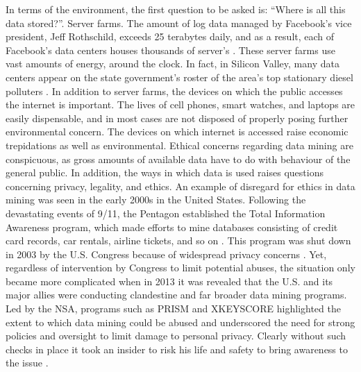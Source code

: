 \documentclass[12pt,letterpaper]{article}
\begin{document}
In terms of the environment, the first question to be asked is: “Where is all this data stored?”. Server farms. The amount of log data managed by Facebook’s vice president, Jeff Rothschild, exceeds 25 terabytes daily, and as a result, each of Facebook’s data centers houses thousands of server’s \cite{data mining 3}. These server farms use vast amounts of energy, around the clock. In fact, in Silicon Valley, many data centers appear on the state government’s roster of the area’s top stationary diesel polluters \cite{data mining 4}. In addition to server farms, the devices on which the public accesses the internet is important. The lives of cell phones, smart watches, and laptops are easily dispensable, and in most cases are not disposed of properly posing further environmental concern. The devices on which internet is accessed raise economic trepidations as well as environmental.
Ethical concerns regarding data mining are conspicuous, as gross amounts of available data have to do with behaviour of the general public. In addition, the ways in which data is used raises questions concerning privacy, legality, and ethics. An example of disregard for ethics in data mining was seen in the early 2000s in the United States. Following the devastating events of 9/11, the Pentagon established the Total Information Awareness program, which made efforts to mine databases consisting of credit card records, car rentals, airline tickets, and so on \cite{data mining 5}. This program was shut down in 2003 by the U.S. Congress because of widespread privacy concerns \cite{data mining 6}.  Yet, regardless of intervention by Congress to limit potential abuses, the situation only became more complicated when in 2013 it was revealed that the U.S. and its major allies were conducting clandestine and far broader data mining programs.  Led by the NSA, programs such as PRISM and XKEYSCORE \cite{data mining 7} highlighted the extent to which data mining could be abused and underscored the need for strong policies and oversight to limit damage to personal privacy.  Clearly without such checks in place it took an insider to risk his life and safety to bring awareness to the issue \cite{data mining 8}.
\end{document}
